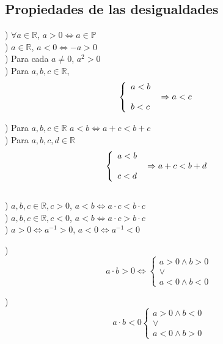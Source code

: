 \subsection{Propiedades de las desigualdades}

) $\forall a\in\mathbb{R}$, $a>0\Leftrightarrow a\in\mathbb{P}$ \\

) $a\in\mathbb{R}$,  $a<0\Leftrightarrow -a>0$ \\
) Para cada $a\neq 0$, $a^{2}>0$ \\
) Para $a,b,c\in\mathbb{R}$, 
$$\left\{\begin{array}{ll} 
a<b \\
\hspace{35px}\Rightarrow a<c\\
b<c
\end{array} \right. \\$$

) Para $a,b,c\in\mathbb{R}$ $a<b\Leftrightarrow a+c<b+c$\\

) Para $a,b,c,d\in\mathbb{R}$
$$
\left\{\begin{array}{ll}
a<b\\
\hspace{35px} \Rightarrow a+c<b+d\\
c<d
\end{array}\right. $$\\

) $a,b,c\in\mathbb{R}, c>0$, $a<b\Leftrightarrow a\cdot c< b\cdot c$\\

) $a,b,c\in\mathbb{R}, c<0$, $a<b\Leftrightarrow a\cdot c> b\cdot c$\\

) $a>0\Leftrightarrow a^{-1}>0$, \hspace{10px} $a<0\Leftrightarrow a^{-1}<0$

) $$ a\cdot b>0\Leftrightarrow \left\{ 
\begin{array}{ll}
a>0 \wedge b>0\\
\vee \\
a<0 \wedge b<0
\end{array}
\right. $$

) $$ a\cdot b<0 \left\{\begin{array}{ll}
a>0 \wedge b<0\\
\vee \\
a<0 \wedge b>0
\end{array} \right.$$

